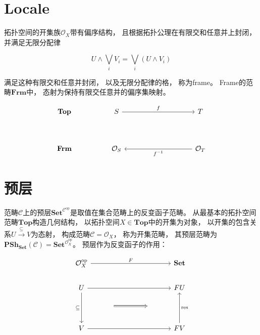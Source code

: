 \documentclass[10pt, openany]{book}
\begin{document}
\section{Locale}

拓扑空间的开集族$\mathcal O_X$带有偏序结构，
且根据拓扑公理在有限交和任意并上封闭，
并满足无限分配律

$$
U \wedge \bigvee_i V_i = \bigvee_i (U \wedge V_i)
$$

满足这种有限交和任意并封闭，
以及无限分配律的格，
称为frame。
Frame的范畴$\textbf{Frm}$中，
态射为保持有限交任意并的偏序集映射。

$$
\begin{tikzcd}
\textbf{Top} &  & S \arrow[rrrr, "f"] &  &  &  & T                                   \\
             &  &                     &  &  &  &                                     \\
\textbf{Frm} &  & \mathcal O_S        &  &  &  & \mathcal O_T \arrow[llll, "f^{-1}"]
\end{tikzcd}
$$

\section{预层}

范畴$\mathcal C$上的预层$\textbf{Set}^{\mathcal C^\text{op}}$是取值在集合范畴上的反变函子范畴。
从最基本的拓扑空间范畴$\textbf{Top}$构造几何结构，
以拓扑空间$X\in\textbf{Top}$中的开集为对象，
以开集的包含关系$U \stackrel{\subseteq}{\longrightarrow} V$为态射，
构成范畴$\mathcal C = \mathcal O_X$，
称为开集范畴，
其预层范畴为$\textbf{PSh}_\textbf{Set}(\mathcal C) = \textbf{Set}^{\mathcal O_X^\text{op}}$。
预层作为反变函子的作用：

$$
\begin{tikzcd}
\mathcal O_X^\text{op} \arrow[rrrr, "F"] &                           &  &    & \textbf{Set}                 \\
U \arrow[dd, "\subseteq"'] \arrow[rrrr]  &                           &  &    & FU                           \\
                                         & {} \arrow[rr, Rightarrow] &  & {} &                              \\
V \arrow[rrrr]                           &                           &  &    & FV \arrow[uu, "\text{res}"']
\end{tikzcd}
$$
\end{document}
